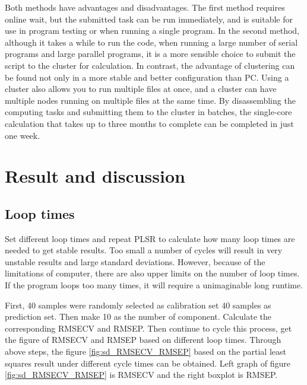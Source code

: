\documentclass[a4paper,12pt,titlepage]{article} %
\numberwithin{equation}{section}  %
\begin{document}
	Both methods have advantages and disadvantages.
	The first method requires online wait, but the submitted task can be run immediately, and is suitable for use in program testing or when running a single program. In the second method, although it takes a while to run the code, when running a large number of serial programs and large parallel programs, it is a more sensible choice to submit the script to the cluster for calculation. In contrast, the advantage of clustering can be found not only in a more stable and better configuration than PC. Using a cluster also allows you to run multiple files at once, and a cluster can have multiple nodes running on multiple files at the same time. By disassembling the computing tasks and submitting them to the cluster in batches, the single-core calculation that takes up to three months to complete can be completed in just one week.
	
	\section{Result and discussion}
	\label{sec:result}
	
	\subsection{Loop times}
	\label{sec:Loop times}
	
	Set different loop times and repeat PLSR to calculate how many loop times are needed to get stable results. Too small a number of cycles will result in very unstable results and large standard deviations. However, because of the limitations of computer, there are also upper limits on the number of loop times. If the program loops too many times, it will require a unimaginable long runtime.
	
	First, 40 samples were randomly selected as calibration set 40 samples as prediction set. Then make 10 as the number of component. Calculate the corresponding RMSECV and RMSEP. Then continue to cycle this process, get the figure of RMSECV and RMSEP based on different loop times. Through above steps, the  figure \ref{fig:sd_RMSECV_RMSEP} based on the partial least squares result under different cycle times can be obtained. Left graph of figure \ref{fig:sd_RMSECV_RMSEP} is RMSECV and the right boxplot is RMSEP.
	
\end{document}
